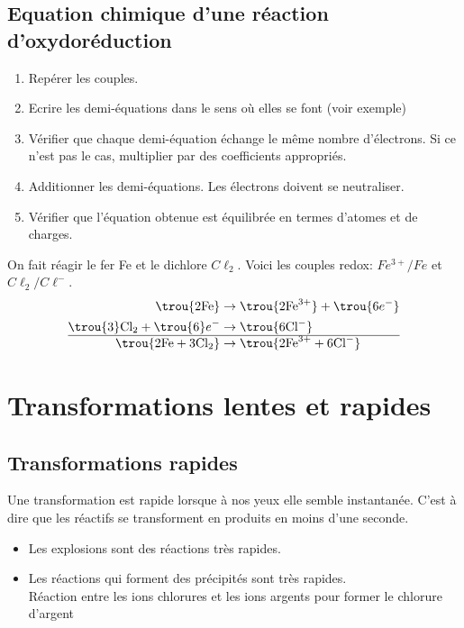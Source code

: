 \subsection{Equation chimique d'une réaction d'oxydoréduction}
 {
\begin{enumerate}
	\item Repérer les couples.
	\item Ecrire les demi-équations dans le sens où elles se font (voir exemple) 
	\item Vérifier que chaque demi-équation échange le même nombre d'électrons. Si ce n'est pas le cas, multiplier par des coefficients appropriés.
	\item Additionner les demi-équations. Les électrons doivent se neutraliser.
	\item Vérifier que l'équation obtenue est équilibrée en termes d'atomes et de charges.
\end{enumerate}
}

 On fait réagir le fer Fe et le dichlore $C\ell_2$. Voici les couples redox: $Fe^{3+}/Fe$ et $C\ell_2 / C\ell^-$.
\begin{align*}
 \trou{ 2\text{Fe}} &\rightarrow \trou{2\text{Fe}^{3+}} +\trou{ 6e^-} \\
    \trou{3}\text{Cl}_2 + \trou{6}e^- &\rightarrow \trou{6\text{Cl}^- }\\
    \hline
    \trou{2\text{Fe} + 3\text{Cl}_2 }&\rightarrow \trou{2\text{Fe}^{3+} + 6\text{Cl}^-}
\end{align*}


\section{Transformations lentes et rapides}
\subsection{Transformations rapides}
Une transformation est rapide lorsque à nos yeux elle semble instantanée. C'est à dire que les réactifs se transforment en produits en moins d'une seconde.

\begin{itemize}
	\item Les explosions sont des réactions très rapides.
	\item Les réactions qui forment des précipités sont très rapides. \\
Réaction entre les ions chlorures et les ions argents pour former le chlorure d'argent

\end{itemize}

